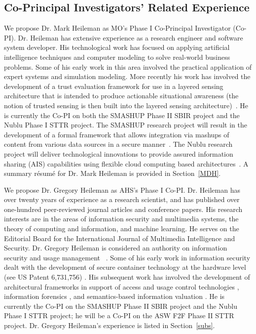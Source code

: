 \documentclass{sbir}
\begin{document}

\subsection{Co-Principal Investigators' Related Experience}
We propose Dr. Mark Heileman as MO's Phase I Co-Principal Investigator (Co-PI). Dr. Heileman has extensive experience as a research engineer and software system developer. His technological work has focused on applying artificial intelligence techniques and computer modeling to solve real-world business problems. Some of his early work in this area involved the practical application of expert systems and simulation modeling. More recently his work has involved the development of a trust evaluation framework for use in a layered sensing architecture that is intended to produce actionable situational awareness (the notion of trusted sensing is then built into the layered sensing architecture)~\cite{HeHeFiSt:09,HeHeHw:09}. He is currently the Co-PI on both the SMASHUP Phase II SBIR project and the Nublu Phase I STTR project. The SMASHUP research project will result in the development of a formal framework that allows integration via mashups of content from various data sources in a secure manner~\cite{HeHeGiEv:10,HeHeShGiJa:11}. The Nublu research project will deliver technological innovations to provide assured information sharing (AIS) capabilities using flexible cloud computing based architectures~\cite{HeHeNaLa:12}. A summary r\'esum\'e for Dr. Mark Heileman is provided in Section~\ref{MDH}.

We propose Dr. Gregory Heileman as AHS's Phase I Co-PI. Dr. Heileman has over twenty years of experience as a research scientist, and has published over one-hundred peer-reviewed journal articles and conference papers. His research interests are in the areas of information security and multimedia systems, the theory of computing and information, and machine learning. He serves on the Editorial Board for the International Journal of Multimedia Intelligence and Security. Dr. Gregory Heileman is considered an authority on information security and usage management ~\cite{Informatics}.  Some of his early work in information security dealt with the development of secure container technology at the hardware level (see US Patent 6,731,756) \cite{PiHe:04}. His subsequent work has involved the development of architectural frameworks in support of access and usage control technologies \cite{HeJa:05,HeJaKhHr:07,JaHe:04,JaHeMa:06}, information forensics \cite{PeHeAb:07,QuPeHe:09}, and semantics-based information valuation \cite{AlHe:10,AlHe:08}. He is currently the Co-PI on the SMASHUP Phase II SBIR project and the Nublu Phase I STTR project; he will be a Co-PI on the ASW F2F Phase II STTR project. Dr. Gregory Heileman's experience is listed in Section~\ref{subs}.
\end{document}
